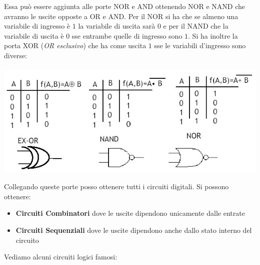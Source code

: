 \documentclass[a4paper,12pt, oneside]{book}
\begin{document}
\begin{itemize}
Essa può essere aggiunta alle porte NOR e AND ottenendo NOR e NAND che avranno le uscite opposte a OR e AND. Per il NOR si ha che se almeno una variabile di ingresso è $1$ la variabile di uscita sarà $0$ e per il NAND che la variabile di uscita è $0$ sse entrambe quelle di ingresso sono $1$. Si ha inoltre la porta XOR (\textit{OR esclusivo}) che ha come uscita $1$ sse le variabili d'ingresso sono diverse:\\
\\
\includegraphics[scale=0.57]{img/nornand.jpg}\\
\end{itemize}
Collegando queste porte posso ottenere tutti i circuiti digitali. Si possono ottenere:
\begin{itemize}
\item \textbf{Circuiti Combinatori} dove le uscite dipendono unicamente dalle entrate
\item \textbf{Circuiti Sequenziali} dove le uscite dipendono anche dallo stato interno del circuito
\end{itemize}
\newpage
Vediamo alcuni circuiti logici famosi:
\end{document}
